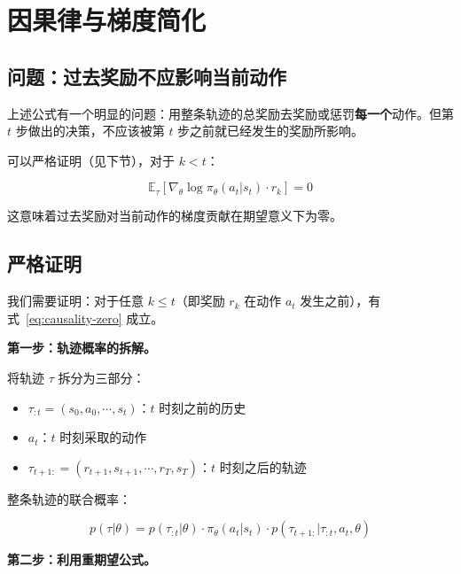 \documentclass[12pt,a4paper]{article}
\newcommand{\E}{\mathbb{E}}
\newcommand{\grad}{\nabla}
\theoremstyle{noteplain}
\theoremstyle{noteexercise}
\begin{document}
\section{因果律与梯度简化}\label{sec:causality}

\subsection{问题：过去奖励不应影响当前动作}\label{ssec:causality-problem}

上述公式有一个明显的问题：用整条轨迹的总奖励去奖励或惩罚\textbf{每一个}动作。但第 $t$ 步做出的决策，不应该被第 $t$ 步之前就已经发生的奖励所影响。

可以严格证明（见下节），对于 $k < t$：

\begin{equation}\label{eq:causality-zero}
  \E_\tau\!\left[ \grad_\theta \log \pi_\theta(a_t|s_t) \cdot r_k \right] = 0
\end{equation}

这意味着过去奖励对当前动作的梯度贡献在期望意义下为零。

\subsection{严格证明}\label{ssec:causality-proof}

我们需要证明：对于任意 $k \le t$（即奖励 $r_k$ 在动作 $a_t$ 发生之前），有式~\eqref{eq:causality-zero} 成立。

\textbf{第一步：轨迹概率的拆解。}

将轨迹 $\tau$ 拆分为三部分：
\begin{itemize}
  \item $\tau_{:t} = (s_0,a_0,\cdots,s_t)$：$t$ 时刻之前的历史
  \item $a_t$：$t$ 时刻采取的动作
  \item $\tau_{t+1:} = (r_{t+1},s_{t+1},\cdots,r_T,s_T)$：$t$ 时刻之后的轨迹
\end{itemize}

整条轨迹的联合概率：

\begin{equation}\label{eq:tau-split}
  p(\tau|\theta) = p(\tau_{:t}|\theta) \cdot \pi_\theta(a_t|s_t) \cdot p(\tau_{t+1:}|\tau_{:t},a_t,\theta)
\end{equation}

\textbf{第二步：利用重期望公式。}
\end{document}
